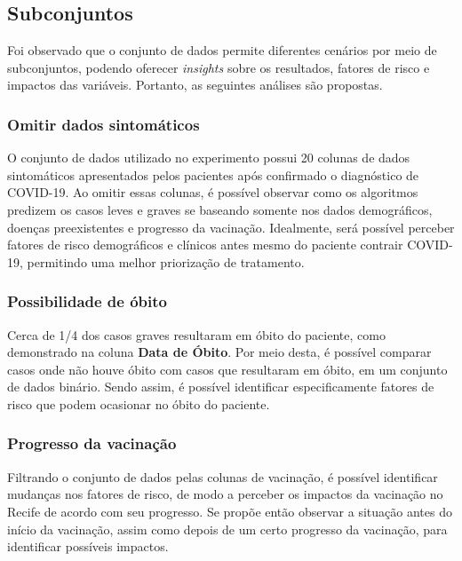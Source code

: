 \subsection{Subconjuntos}
\label{subsec:subconjuntos}

Foi observado que o conjunto de dados permite diferentes cenários por meio de subconjuntos, podendo oferecer \textit{insights} sobre os resultados, fatores de risco e impactos das variáveis. Portanto, as seguintes análises são propostas.

\subsubsection{Omitir dados sintomáticos}
\label{subsubsec:omitindosintomas}

O conjunto de dados utilizado no experimento possui 20 colunas de dados sintomáticos apresentados pelos pacientes após confirmado o diagnóstico de COVID-19. Ao omitir essas colunas, é possível observar como os algoritmos predizem os casos leves e graves se baseando somente nos dados demográficos, doenças preexistentes e progresso da vacinação. Idealmente, será possível perceber fatores de risco demográficos e clínicos antes mesmo do paciente contrair COVID-19, permitindo uma melhor priorização de tratamento.

\subsubsection{Possibilidade de óbito}
\label{subsubsec:analisandoobito}

Cerca de 1/4 dos casos graves resultaram em óbito do paciente, como demonstrado na coluna \textbf{Data de Óbito}. Por meio desta, é possível comparar casos onde não houve óbito com casos que resultaram em óbito, em um conjunto de dados binário. Sendo assim, é possível identificar especificamente fatores de risco que podem ocasionar no óbito do paciente.

\subsubsection{Progresso da vacinação}
\label{subsubsec:progressovacinacao}

Filtrando o conjunto de dados pelas colunas de vacinação, é possível identificar mudanças nos fatores de risco, de modo a perceber os impactos da vacinação no Recife de acordo com seu progresso. Se propõe então observar a situação antes do início da vacinação, assim como depois de um certo progresso da vacinação, para identificar possíveis impactos. 

